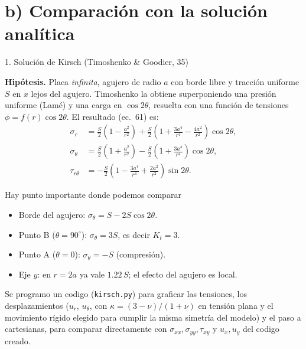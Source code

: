\newpage
\section*{b) Comparaci\'on con la soluci\'on anal\'itica}

\begin{desarrollo}{1. Soluci\'on de Kirsch (Timoshenko \& Goodier, 35)}

\textbf{Hip\'otesis.} Placa \emph{infinita}, agujero de radio $a$ con borde libre
y tracci\'on uniforme $S$ en $x$ lejos del agujero. Timoshenko la obtiene
superponiendo una presi\'on uniforme (Lam\'e) y una carga en $\cos2\theta$,
resuelta con una funci\'on de tensiones $\phi=f(r)\cos2\theta$. El resultado
(ec.~61) es:
\begin{align*}
\sigma_r&=\tfrac S2\left(1-\tfrac{a^2}{r^2}\right)+\tfrac S2\left(1+\tfrac{3a^4}{r^4}-\tfrac{4a^2}{r^2}\right)\cos2\theta,\\
\sigma_\theta&=\tfrac S2\left(1+\tfrac{a^2}{r^2}\right)-\tfrac S2\left(1+\tfrac{3a^4}{r^4}\right)\cos2\theta,\\
\tau_{r\theta}&=-\tfrac S2\left(1-\tfrac{3a^4}{r^4}+\tfrac{2a^2}{r^2}\right)\sin2\theta .
\end{align*}

Hay punto importante donde podemos comparar 
\begin{itemize}[itemsep=2pt]
  \item Borde del agujero: $\sigma_\theta=S-2S\cos2\theta$.
  \item Punto B ($\theta=90^\circ$): $\sigma_\theta=3S$, es decir $K_t=3$.
  \item Punto A ($\theta=0$): $\sigma_\theta=-S$ (compresi\'on).
  \item Eje $y$: en $r=2a$ ya vale $1.22\,S$; el efecto del agujero es local.
\end{itemize}

Se programo un codigo (\texttt{kirsch.py}) para graficar las tensiones,
los desplazamientos ($u_r$, $u_\theta$, con $\kappa=(3-\nu)/(1+\nu)$ en tensi\'on
plana y el movimiento r\'igido elegido para cumplir la misma simetr\'ia del
modelo) y el paso a cartesianas, para comparar directamente con
$\sigma_{xx},\sigma_{yy},\tau_{xy}$ y $u_x,u_y$ del codigo creado.

\begin{center}

\vspace{6pt}
\end{center}
\end{desarrollo}

